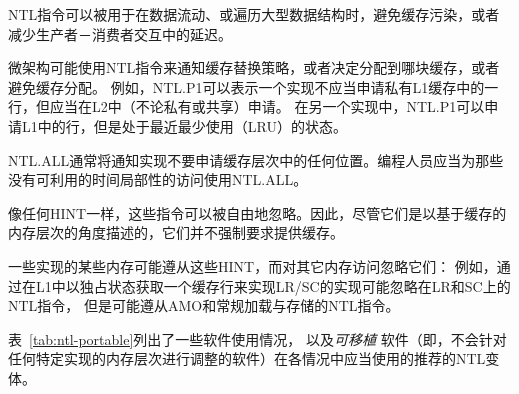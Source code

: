 \begin{commentary}
NTL指令可以被用于在数据流动、或遍历大型数据结构时，避免缓存污染，或者减少生产者－消费者交互中的延迟。

微架构可能使用NTL指令来通知缓存替换策略，或者决定分配到哪块缓存，或者避免缓存分配。
例如，NTL.P1可以表示一个实现不应当申请私有L1缓存中的一行，但应当在L2中（不论私有或共享）申请。
在另一个实现中，NTL.P1可以申请L1中的行，但是处于最近最少使用（LRU）的状态。

NTL.ALL通常将通知实现不要申请缓存层次中的任何位置。编程人员应当为那些没有可利用的时间局部性的访问使用NTL.ALL。

像任何HINT一样，这些指令可以被自由地忽略。因此，尽管它们是以基于缓存的内存层次的角度描述的，它们并不强制要求提供缓存。

一些实现的某些内存可能遵从这些HINT，而对其它内存访问忽略它们：
例如，通过在L1中以独占状态获取一个缓存行来实现LR/SC的实现可能忽略在LR和SC上的NTL指令，
但是可能遵从AMO和常规加载与存储的NTL指令。
\end{commentary}

表~\ref{tab:ntl-portable}列出了一些软件使用情况，
以及{\em 可移植} 软件（即，不会针对任何特定实现的内存层次进行调整的软件）在各情况中应当使用的推荐的NTL变体。

